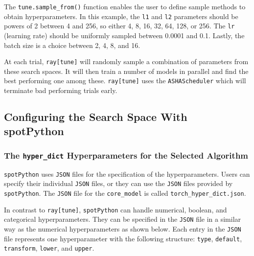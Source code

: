\documentclass[
  letterpaper,
  DIV=11,
  numbers=noendperiod]{scrreprt}
\begin{document}
The \texttt{tune.sample\_from()} function enables the user to define
sample methods to obtain hyperparameters. In this example, the
\texttt{l1} and \texttt{l2} parameters should be powers of 2 between 4
and 256, so either 4, 8, 16, 32, 64, 128, or 256. The \texttt{lr}
(learning rate) should be uniformly sampled between 0.0001 and 0.1.
Lastly, the batch size is a choice between 2, 4, 8, and 16.

At each trial, \texttt{ray{[}tune{]}} will randomly sample a combination
of parameters from these search spaces. It will then train a number of
models in parallel and find the best performing one among these.
\texttt{ray{[}tune{]}} uses the \texttt{ASHAScheduler} which will
terminate bad performing trials early.

\hypertarget{sec-configuring-search-space-spotpython-14}{%
\subsection{Configuring the Search Space With
spotPython}\label{sec-configuring-search-space-spotpython-14}}

\hypertarget{the-hyper_dict-hyperparameters-for-the-selected-algorithm}{%
\subsubsection{\texorpdfstring{The \texttt{hyper\_dict} Hyperparameters
for the Selected
Algorithm}{The hyper\_dict Hyperparameters for the Selected Algorithm}}\label{the-hyper_dict-hyperparameters-for-the-selected-algorithm}}

\texttt{spotPython} uses \texttt{JSON} files for the specification of
the hyperparameters. Users can specify their individual \texttt{JSON}
files, or they can use the \texttt{JSON} files provided by
\texttt{spotPython}. The \texttt{JSON} file for the \texttt{core\_model}
is called \texttt{torch\_hyper\_dict.json}.

In contrast to \texttt{ray{[}tune{]}}, \texttt{spotPython} can handle
numerical, boolean, and categorical hyperparameters. They can be
specified in the \texttt{JSON} file in a similar way as the numerical
hyperparameters as shown below. Each entry in the \texttt{JSON} file
represents one hyperparameter with the following structure:
\texttt{type}, \texttt{default}, \texttt{transform}, \texttt{lower}, and
\texttt{upper}.
\end{document}
